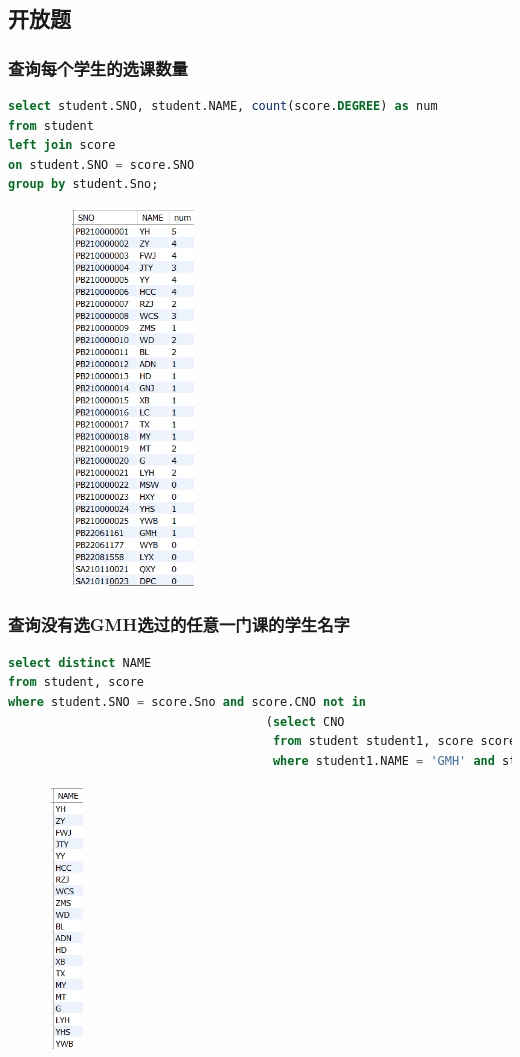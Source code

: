\documentclass{ctexart}
\begin{document}
\subsection{开放题}
\subsubsection{查询每个学生的选课数量}
\begin{lstlisting}[language=sql]
select student.SNO, student.NAME, count(score.DEGREE) as num
from student
left join score
on student.SNO = score.SNO
group by student.Sno;
\end{lstlisting}
\begin{figure}[H]
	\centering 
	\includegraphics[height=10cm,width=4.5cm]{60.png}
	\end{figure}
\subsubsection{查询没有选GMH选过的任意一门课的学生名字}
\begin{lstlisting}[language=sql]
select distinct NAME  
from student, score 
where student.SNO = score.Sno and score.CNO not in
									(select CNO
									 from student student1, score score1
									 where student1.NAME = 'GMH' and student1.Sno = score1.Sno);
\end{lstlisting}
\begin{figure}[H]
	\centering 
	\includegraphics[height=7cm,width=1cm]{61.png}
	\end{figure}

    
\end{document}
